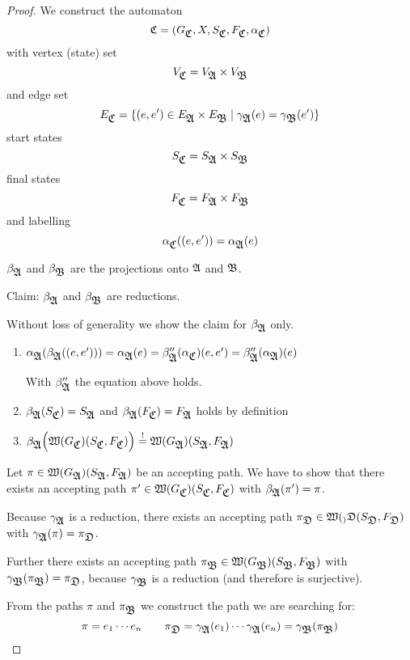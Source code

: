 \begin{proof}
We construct the automaton 
\[ \fa{C} = (G_{\fa{C}}, X, S_{\fa{C}}, F_{\fa{C}}, \alpha_{\fa{C}}) \]
with vertex (state) set
\[ V_{\fa{C}} = V_{\fa{A}} \times V_{\fa{B}} \]
and edge set
\[ E_{\fa{C}} = \{ (e, e') \in E_{\fa{A}} \times E_{\fa{B}} \mid
\gamma_{\fa{A}}(e) = \gamma_{\fa{B}}(e') \} \]
start states
\[ S_{\fa{C}} = S_{\fa{A}} \times S_{\fa{B}} \]
final states
\[ F_{\fa{C}} = F_{\fa{A}} \times F_{\fa{B}} \]
and labelling
\[ \alpha_{\fa{C}}((e, e')) = \alpha_{\fa{A}}(e) \] 

$\beta_{\fa{A}}$ and $\beta_{\fa{B}}$ are the projections onto $\fa{A}$ and
$\fa{B}$.

Claim: $\beta_{\fa{A}}$ and $\beta_{\fa{B}}$ are reductions.

Without loss of generality we show the claim for $\beta_{\fa{A}}$ only.

\begin{enumerate}
\item $\alpha_{\fa{A}}(\beta_{\fa{A}}((e,e'))) = \alpha_{\fa{A}}(e) =
\beta''_{\fa{A}}(\alpha_{\fa{C}})(e, e') = \beta''_{\fa{A}}(\alpha_{\fa{A}})(e)$

With $\beta''_{\fa{A}}$ the equation above holds.
\item $\beta_{\fa{A}}(S_{\fa{C}}) = S_{\fa{A}}$ and $\beta_{\fa{A}}(F_{\fa{C}})
= F_{\fa{A}}$ holds by definition
\item $\beta_{\fa{A}}\Big(\pathcategory{G_{\fa{C}}}(S_{\fa{C}}, F_{\fa{C}})\Big)
\stackrel{!}{=} \pathcategory{G_{\fa{A}}}(S_{\fa{A}}, F_{\fa{A}})$
\end{enumerate}

Let $\pi \in \pathcategory{G_{\fa{A}}}(S_{\fa{A}}, F_{\fa{A}})$ be an accepting path.
We have to show that there exists an accepting path $\pi' \in
\pathcategory{G_{\fa{C}}}(S_{\fa{C}}, F_{\fa{C}})$ with $\beta_{\fa{A}}(\pi') = \pi$.

Because $\gamma_{\fa{A}}$ is a reduction, there exists an accepting path
$\pi_{\fa{D}} \in \pathcategory_{\fa{D}}(S_{\fa{D}}, F_{\fa{D}})$ with
$\gamma_{\fa{A}}(\pi) = \pi_{\fa{D}}$.

Further there exists an accepting path $\pi_{\fa{B}} \in
\pathcategory{G_{\fa{B}}}(S_{\fa{B}}, F_{\fa{B}})$ with
$\gamma_{\fa{B}}(\pi_{\fa{B}}) = \pi_{\fa{D}}$, because $\gamma_{\fa{B}}$ is a
reduction (and therefore is surjective).

From the paths $\pi$ and $\pi_{\fa{B}}$ we construct the path we are searching
for:
\[ \pi = e_1 \cdots e_n \qquad \pi_{\fa{D}} = \gamma_{\fa{A}}(e_1) \cdots
\gamma_{\fa{A}}(e_n) = \gamma_{\fa{B}}(\pi_{\fa{B}}) \]


\end{proof}
